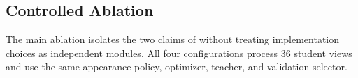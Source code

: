 \begin{table}[t]
\centering
\caption{MM-WHS MRI results under the frozen 4-labeled/12-unlabeled protocol. Method hyperparameters are transferred unchanged; the profile law is designed using labeled training volumes only.}
\label{tab:mmwhs_main}
\end{table}

\subsection{Controlled Ablation}
The main ablation isolates the two claims of \method{} without treating implementation choices as independent modules. All four configurations process 36 student views and use the same appearance policy, optimizer, teacher, and validation selector.


